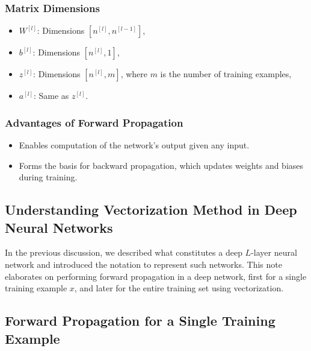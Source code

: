 \documentclass[letterpaper,12pt,notitlepage,twoside]{report}
\begin{document}
\subsubsection*{Matrix Dimensions}

\begin{itemize}
    \item \( W^{[l]} \): Dimensions \( [n^{[l]}, n^{[l-1]}] \),
    \item \( b^{[l]} \): Dimensions \( [n^{[l]}, 1] \),
    \item \( z^{[l]} \): Dimensions \( [n^{[l]}, m] \), where \( m \) is the number of training examples,
    \item \( a^{[l]} \): Same as \( z^{[l]} \).
\end{itemize}

\subsubsection*{Advantages of Forward Propagation}
\begin{itemize}
    \item Enables computation of the network's output given any input.
    \item Forms the basis for backward propagation, which updates weights and biases during training.
\end{itemize}

\subsection{Understanding Vectorization Method in Deep Neural Networks}

In the previous discussion, we described what constitutes a deep \( L \)-layer neural network and introduced the notation to represent such networks. This note elaborates on performing forward propagation in a deep network, first for a single training example \( x \), and later for the entire training set using vectorization.

\subsection*{Forward Propagation for a Single Training Example}
\end{document}
